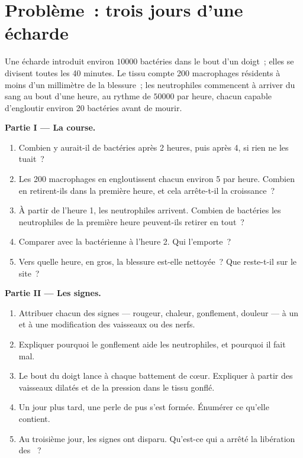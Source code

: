 \section{Problème~: trois jours d'une écharde}

\begin{problem}
\label{pb:g12:innate-immunity:1}
Une écharde introduit environ $\num{10000}$ bactéries dans le bout
d'un doigt~; elles se divisent toutes les 40 minutes. Le tissu compte
200 macrophages résidents à moins d'un millimètre de la blessure~; les
neutrophiles commencent à arriver du sang au bout d'une heure, au
rythme de $\num{50000}$ par heure, chacun capable d'engloutir environ
20 bactéries avant de mourir.

\medskip
\noindent\textbf{Partie I --- La course.}
\begin{enumerate}
  \item Combien y aurait-il de bactéries après 2 heures, puis après 4,
        si rien ne les tuait~?
  \item Les 200 macrophages en engloutissent chacun environ 5 par
        heure. Combien en retirent-ils dans la première heure, et cela
        arrête-t-il la croissance~?
  \item À partir de l'heure 1, les neutrophiles arrivent. Combien de
        bactéries les neutrophiles de la première heure peuvent-ils
        retirer en tout~?
  \item Comparer avec la  bactérienne à l'heure 2. Qui
        l'emporte~?
  \item Vers quelle heure, en gros, la blessure est-elle nettoyée~?
        Que reste-t-il sur le site~?
\end{enumerate}

\medskip
\noindent\textbf{Partie II --- Les signes.}
\begin{enumerate}[resume]
  \item Attribuer chacun des signes --- rougeur, chaleur, gonflement,
        douleur --- à un  et à une modification des vaisseaux
        ou des nerfs.
  \item Expliquer pourquoi le gonflement aide les neutrophiles, et
        pourquoi il fait mal.
  \item Le bout du doigt lance à chaque battement de cœur. Expliquer à
        partir des vaisseaux dilatés et de la pression dans le tissu
        gonflé.
  \item Un jour plus tard, une perle de pus s'est formée. Énumérer ce
        qu'elle contient.
  \item Au troisième jour, les signes ont disparu. Qu'est-ce qui a
        arrêté la libération des ~?
\end{enumerate}


\end{problem}
